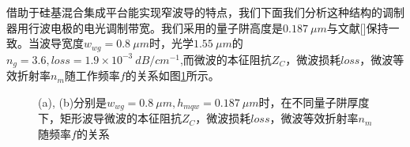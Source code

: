 借助于硅基混合集成平台能实现窄波导的特点，我们下面我们分析这种结构的调制器用行波电极的电光调制带宽。我们采用的量子阱高度是$0.187~ \mu m$与文献[]保持一致。当波导宽度$w_{wg} = 0.8~ \mu m$时，光学$1.55~ \mu m$的$n_g = 3.6, loss = 1.9 \times 10^{-3} ~dB/cm^{-1} $,而微波的本征阻抗$Z_C$，微波损耗$loss$，微波等效折射率$n_m$随工作频率$f$的关系如图\ref{fig_ch2_rect_freq_property}所示。
\begin{figure}[htb]
	\small
\caption{(a), (b)分别是$w_{wg} = 0.8 ~\mu m, h_{mqw} = 0.187 ~\mu m$时，在不同量子阱厚度下，矩形波导微波的本征阻抗$Z_C$，微波损耗$loss$，微波等效折射率$n_m$随频率$f$的关系}
\label{fig_ch2_rect_freq_property}	
\end{figure}

